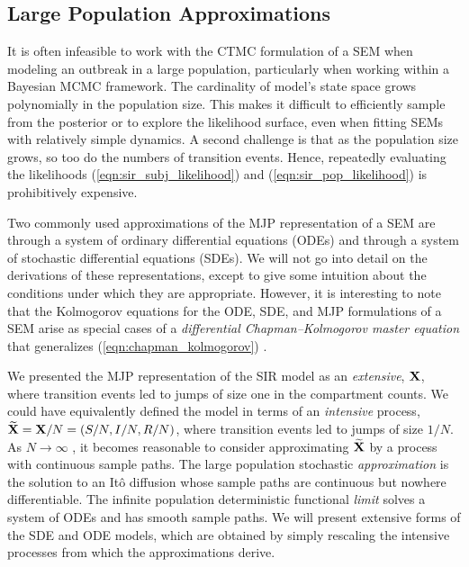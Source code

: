 \subsection{Large Population Approximations}
\label{subsec:sem_approximations}

It is often infeasible to work with the CTMC formulation of a SEM when modeling an outbreak in a large population, particularly when working within a Bayesian MCMC framework. The cardinality of model's state space grows polynomially in the population size. This makes it difficult to efficiently sample from the posterior or to explore the likelihood surface, even when fitting SEMs with relatively simple dynamics. A second challenge is that as the population size grows, so too do the numbers of transition events. Hence, repeatedly evaluating the likelihoods (\ref{eqn:sir_subj_likelihood}) and (\ref{eqn:sir_pop_likelihood}) is prohibitively expensive. 

Two commonly used approximations of the MJP representation of a SEM are through a system of ordinary differential equations (ODEs) and through a system of stochastic differential equations (SDEs). We will not go into detail on the derivations of these representations, except to give some intuition about the conditions under which they are appropriate. However, it is interesting to note that the Kolmogorov equations for the ODE, SDE, and MJP formulations of a SEM arise as special cases of a \textit{differential Chapman--Kolmogorov master equation} that generalizes (\ref{eqn:chapman_kolmogorov}) \cite{fuchs2013inference}. 

We presented the MJP representation of the SIR model as an \textit{extensive}, $ \mathbf{X} $, where transition events led to jumps of size one in the compartment counts. We could have equivalently defined the model in terms of an \textit{intensive} process, $ \widetilde{\mathbf{X}} = \mathbf{X} / N = (S/N,I/N,R/N) $, where transition events led to jumps of size $ 1/N $. As $ N\longrightarrow \infty$ , it becomes reasonable to consider approximating $ \widetilde{\mathbf{X}} $ by a process with continuous sample paths. The large population stochastic \textit{approximation} is the solution to an It\^{o} diffusion whose sample paths are continuous but nowhere differentiable. The infinite population deterministic functional \textit{limit} solves a system of ODEs and has smooth sample paths. We will present extensive forms of the SDE and ODE models, which are obtained by simply rescaling the intensive processes from which the approximations derive. 

